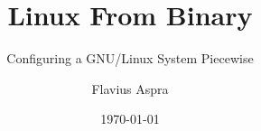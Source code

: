 \documentclass[a4paper,11pt,fleqn,twoside,openright,style=afs]{yapbook}
\title{Linux From Binary}
\subtitle{Configuring a GNU/Linux System Piecewise}
\author{Flavius Aspra}
\date{\today}
\begin{document}
\frontmatter

    \maketitle

    \makecopyright

    \tableofcontents

    

\mainmatter

    
    
    
    
    

\appendix

    

\backmatter
\end{document}
